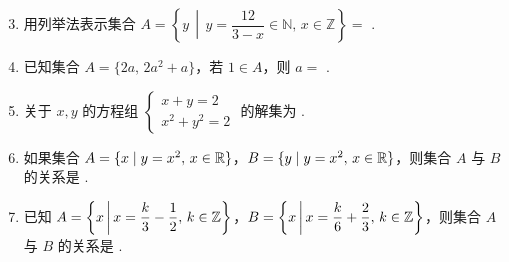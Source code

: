\documentclass[a4paper,11pt]{article}
\begin{document}


\begin{enumerate}
\setcounter{enumi}{2}

\item 用列举法表示集合 $A=\left\{y\,\middle|\,y=\dfrac{12}{3-x}\in\mathbb{N},\,x\in\mathbb{Z}\right\}=$ \blankline[2em].


\item 已知集合 $A=\{2a,\,2a^2+a\}$，若 $1\in A$，则 $a=$ \blankline[2em].


\ifanswer
\solbegin
{}
\solend

\fi
\item 关于 $x,y$ 的方程组 $\begin{cases} x+y=2 \\ x^2+y^2=2 \end{cases}$ 的解集为 \blankline[2em].


\item 如果集合 $A=\{x\mid y=x^2,\,x\in\mathbb{R}\}$，$B=\{y\mid y=x^2,\,x\in\mathbb{R}\}$，则集合 $A$ 与 $B$ 的关系是 \blankline[2em].


\item 已知 $A=\left\{x\,\middle|\,x=\dfrac{k}{3}-\dfrac{1}{2},\,k\in\mathbb{Z}\right\}$，$B=\left\{x\,\middle|\,x=\dfrac{k}{6}+\dfrac{2}{3},\,k\in\mathbb{Z}\right\}$，则集合 $A$ 与 $B$ 的关系是 \blankline[2em].


\end{enumerate}
\end{document}

